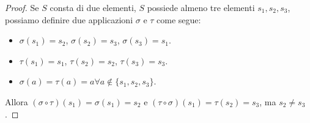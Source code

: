 \begin{proof}
    Se $S$ consta di due elementi, $S$ possiede almeno tre elementi $s_1, s_2, s_3$,
    possiamo definire due applicazioni $\sigma$ e $\tau$ come segue:

    \begin{itemize}
        \item $\sigma(s_1) = s_2$, $\sigma(s_2) = s_3$, $\sigma(s_3) = s_1$.
        \item $\tau(s_1) = s_1$, $\tau(s_2) = s_2$, $\tau(s_3) = s_3$.
        \item $\sigma(a) = \tau(a) = a \forall a \notin \{s_1, s_2, s_3\}$.
    \end{itemize}

    Allora $(\sigma \circ \tau)(s_1) = \sigma(s_1) = s_2$ e
    $(\tau \circ \sigma)(s_1) = \tau(s_2) = s_3$, ma $s_2 \neq s_3$.
\end{proof}

